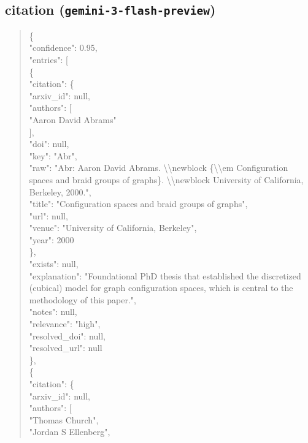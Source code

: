\documentclass[11pt]{article}
\begin{document}
\subsection*{citation (\texttt{gemini-3-flash-preview})}
\begin{quote}\small\ttfamily\raggedright
\{\\
  "confidence": 0.95,\\
  "entries": [\\
    \{\\
      "citation": \{\\
        "arxiv\_id": null,\\
        "authors": [\\
          "Aaron David Abrams"\\
        ],\\
        "doi": null,\\
        "key": "Abr",\\
        "raw": "Abr: Aaron David Abrams. \textbackslash{}\textbackslash{}newblock \{\textbackslash{}\textbackslash{}em Configuration spaces and braid groups of graphs\}. \textbackslash{}\textbackslash{}newblock University of California, Berkeley, 2000.",\\
        "title": "Configuration spaces and braid groups of graphs",\\
        "url": null,\\
        "venue": "University of California, Berkeley",\\
        "year": 2000\\
      \},\\
      "exists": null,\\
      "explanation": "Foundational PhD thesis that established the discretized (cubical) model for graph configuration spaces, which is central to the methodology of this paper.",\\
      "notes": null,\\
      "relevance": "high",\\
      "resolved\_doi": null,\\
      "resolved\_url": null\\
    \},\\
    \{\\
      "citation": \{\\
        "arxiv\_id": null,\\
        "authors": [\\
          "Thomas Church",\\
          "Jordan S Ellenberg",\\

\end{quote}
\end{document}
